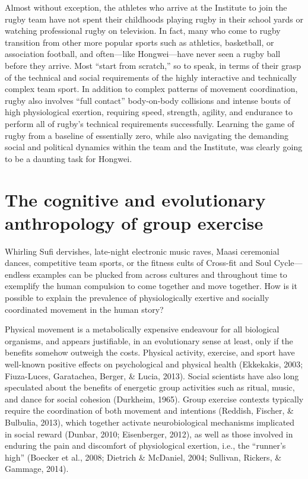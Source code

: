 Almost without exception, the athletes who arrive at the Institute to join the rugby team have not spent their childhoods playing rugby in their school yards or watching professional rugby on television.  In fact, many who come to rugby transition from other more popular sports such as athletics, basketball, or association football, and often---like Hongwei---have never seen a rugby ball before they arrive.  Most ``start from scratch,'' so to speak, in terms of their grasp of the technical and social requirements of the highly interactive and technically complex team sport. In addition to complex patterns of movement coordination, rugby also involves ``full contact'' body-on-body collisions and intense bouts of high physiological exertion, requiring speed, strength, agility, and endurance to perform all of rugby's technical requirements successfully.  Learning the game of rugby from a baseline of essentially zero, while also navigating the demanding social and political dynamics within the team and the Institute, was clearly going to be a daunting task for Hongwei.


\section{The cognitive and evolutionary anthropology of group exercise}
Whirling Sufi dervishes, late-night electronic music raves, Maasi ceremonial dances, competitive team sports, or the fitness cults of Cross-fit and Soul Cycle---endless examples can be plucked from across cultures and throughout time to exemplify the human compulsion to come together and move together. How is it possible to explain the prevalence of physiologically exertive and socially coordinated movement in the human story?

Physical movement is a metabolically expensive endeavour for all biological organisms,  and appears justifiable, in an evolutionary sense at least, only if the benefits somehow outweigh the costs.
Physical activity, exercise, and sport have well-known positive effects on psychological and physical health (Ekkekakis, 2003; Fiuza-Luces, Garatachea, Berger, \& Lucia, 2013).  Social scientists have also long speculated about the benefits of energetic group activities such as ritual, music, and dance for social cohesion (Durkheim, 1965).  Group exercise contexts typically require the coordination of both movement and intentions (Reddish, Fischer, \& Bulbulia, 2013), which together activate neurobiological mechanisms implicated in social reward (Dunbar, 2010; Eisenberger, 2012), as well as those involved in enduring the pain and discomfort of physiological exertion, i.e., the ``runner’s high'' (Boecker et al., 2008; Dietrich \& McDaniel, 2004; Sullivan, Rickers, \& Gammage, 2014).

